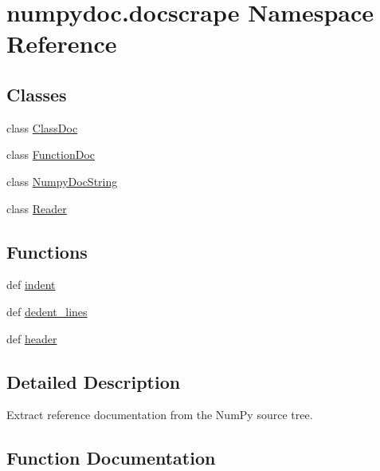 \hypertarget{namespacenumpydoc_1_1docscrape}{}\section{numpydoc.\+docscrape Namespace Reference}
\label{namespacenumpydoc_1_1docscrape}
\subsection*{Classes}
\begin{DoxyCompactItemize}
\item 
class \hyperlink{classnumpydoc_1_1docscrape_1_1ClassDoc}{Class\+Doc}
\item 
class \hyperlink{classnumpydoc_1_1docscrape_1_1FunctionDoc}{Function\+Doc}
\item 
class \hyperlink{classnumpydoc_1_1docscrape_1_1NumpyDocString}{Numpy\+Doc\+String}
\item 
class \hyperlink{classnumpydoc_1_1docscrape_1_1Reader}{Reader}
\end{DoxyCompactItemize}
\subsection*{Functions}
\begin{DoxyCompactItemize}
\item 
def \hyperlink{namespacenumpydoc_1_1docscrape_a5a45a6d941ed9d27713d92fdb62a4321}{indent}
\item 
def \hyperlink{namespacenumpydoc_1_1docscrape_a4b155fb2e557f161a46ec8ffeecbabe0}{dedent\+\_\+lines}
\item 
def \hyperlink{namespacenumpydoc_1_1docscrape_af60515cdad320825de362a2e39bb7db7}{header}
\end{DoxyCompactItemize}


\subsection{Detailed Description}
\begin{DoxyVerb}Extract reference documentation from the NumPy source tree.\end{DoxyVerb}
 

\subsection{Function Documentation}
\hypertarget{namespacenumpydoc_1_1docscrape_a4b155fb2e557f161a46ec8ffeecbabe0}{}
